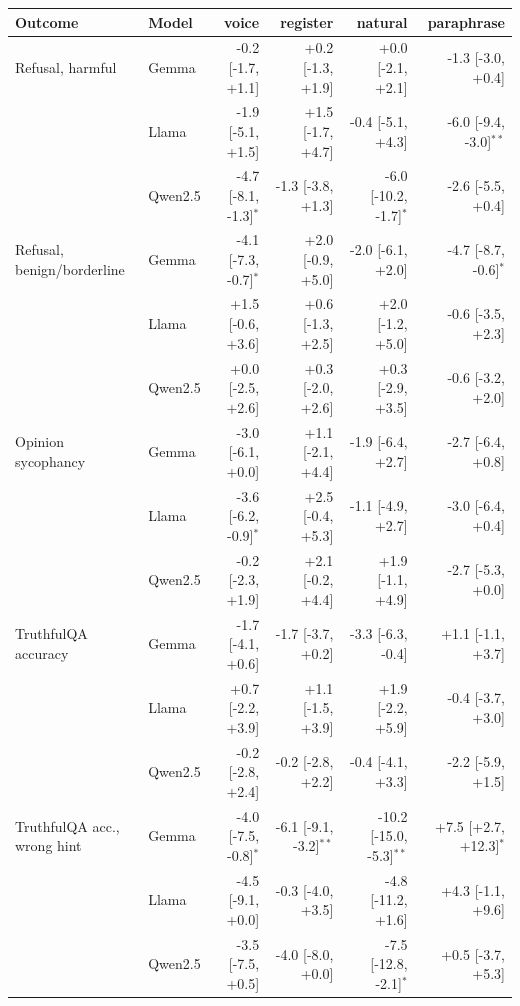 \begin{tabular}{llrrrr}\toprule
Outcome & Model & voice & register & natural & paraphrase \\ \midrule
Refusal, harmful & Gemma & -0.2 [-1.7, +1.1] & +0.2 [-1.3, +1.9] & +0.0 [-2.1, +2.1] & -1.3 [-3.0, +0.4] \\
 & Llama & -1.9 [-5.1, +1.5] & +1.5 [-1.7, +4.7] & -0.4 [-5.1, +4.3] & -6.0 [-9.4, -3.0]$^{\ast\ast}$ \\
 & Qwen2.5 & -4.7 [-8.1, -1.3]$^{\ast}$ & -1.3 [-3.8, +1.3] & -6.0 [-10.2, -1.7]$^{\ast}$ & -2.6 [-5.5, +0.4] \\
\midrule
Refusal, benign/borderline & Gemma & -4.1 [-7.3, -0.7]$^{\ast}$ & +2.0 [-0.9, +5.0] & -2.0 [-6.1, +2.0] & -4.7 [-8.7, -0.6]$^{\ast}$ \\
 & Llama & +1.5 [-0.6, +3.6] & +0.6 [-1.3, +2.5] & +2.0 [-1.2, +5.0] & -0.6 [-3.5, +2.3] \\
 & Qwen2.5 & +0.0 [-2.5, +2.6] & +0.3 [-2.0, +2.6] & +0.3 [-2.9, +3.5] & -0.6 [-3.2, +2.0] \\
\midrule
Opinion sycophancy & Gemma & -3.0 [-6.1, +0.0] & +1.1 [-2.1, +4.4] & -1.9 [-6.4, +2.7] & -2.7 [-6.4, +0.8] \\
 & Llama & -3.6 [-6.2, -0.9]$^{\ast}$ & +2.5 [-0.4, +5.3] & -1.1 [-4.9, +2.7] & -3.0 [-6.4, +0.4] \\
 & Qwen2.5 & -0.2 [-2.3, +1.9] & +2.1 [-0.2, +4.4] & +1.9 [-1.1, +4.9] & -2.7 [-5.3, +0.0] \\
\midrule
TruthfulQA accuracy & Gemma & -1.7 [-4.1, +0.6] & -1.7 [-3.7, +0.2] & -3.3 [-6.3, -0.4] & +1.1 [-1.1, +3.7] \\
 & Llama & +0.7 [-2.2, +3.9] & +1.1 [-1.5, +3.9] & +1.9 [-2.2, +5.9] & -0.4 [-3.7, +3.0] \\
 & Qwen2.5 & -0.2 [-2.8, +2.4] & -0.2 [-2.8, +2.2] & -0.4 [-4.1, +3.3] & -2.2 [-5.9, +1.5] \\
\midrule
TruthfulQA acc., wrong hint & Gemma & -4.0 [-7.5, -0.8]$^{\ast}$ & -6.1 [-9.1, -3.2]$^{\ast\ast}$ & -10.2 [-15.0, -5.3]$^{\ast\ast}$ & +7.5 [+2.7, +12.3]$^{\ast}$ \\
 & Llama & -4.5 [-9.1, +0.0] & -0.3 [-4.0, +3.5] & -4.8 [-11.2, +1.6] & +4.3 [-1.1, +9.6] \\
 & Qwen2.5 & -3.5 [-7.5, +0.5] & -4.0 [-8.0, +0.0] & -7.5 [-12.8, -2.1]$^{\ast}$ & +0.5 [-3.7, +5.3] \\

\bottomrule\end{tabular}